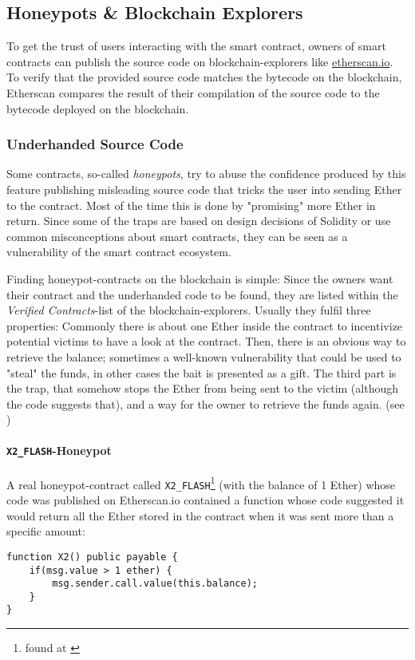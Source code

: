 \subsection{Honeypots \& Blockchain Explorers}
To get the trust of users interacting with the smart contract, owners of smart contracts can publish the source code on blockchain-explorers like \href{https://etherscan.io}{etherscan.io}. To verify that the provided source code matches the bytecode on the blockchain, Etherscan compares the result of their compilation of the source code to the bytecode deployed on the blockchain.

\subsubsection{Underhanded Source Code}
\label{section:honeypot:underhanded}
Some contracts, so-called \textit{honeypots}, try to abuse the confidence produced by this feature publishing misleading source code that tricks the user into sending Ether to the contract. Most of the time this is done by "promising" more Ether in return. Since some of the traps are based on design decisions of Solidity or use common misconceptions about smart contracts, they can be seen as a vulnerability of the smart contract ecosystem.

Finding honeypot-contracts on the blockchain is simple: Since the owners want their contract and the underhanded code to be found, they are listed within the \textit{Verified Contracts}-list of the blockchain-explorers. Usually they fulfil three properties: Commonly there is about one Ether inside the contract to incentivize potential victims to have a look at the contract. Then, there is an obvious way to retrieve the balance; sometimes a well-known vulnerability that could be used to "steal" the funds, in other cases the bait is presented as a gift. The third part is the trap, that somehow stops the Ether from being sent to the victim (although the code suggests that), and a way for the owner to retrieve the funds again. (see \cite{wagner:honeypots})

\paragraph{\texttt{X2_FLASH}-Honeypot}
A real honeypot-contract called \texttt{X2_FLASH}\footnote{found at \cite{etherscan:uncalledcallhoneypot}} (with the balance of 1 Ether) whose code was published on Etherscan.io contained a function whose code suggested it would return all the Ether stored in the contract when it was sent more than a specific amount:
\begin{verbatim}
function X2() public payable {
    if(msg.value > 1 ether) {
        msg.sender.call.value(this.balance);
    }
}
\end{verbatim}

